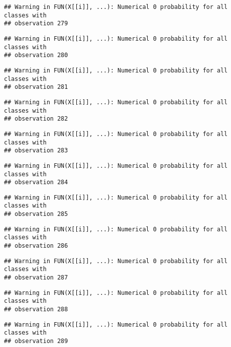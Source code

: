 \documentclass[
]{article}
\begin{document}
\begin{verbatim}
## Warning in FUN(X[[i]], ...): Numerical 0 probability for all classes with
## observation 279
\end{verbatim}

\begin{verbatim}
## Warning in FUN(X[[i]], ...): Numerical 0 probability for all classes with
## observation 280
\end{verbatim}

\begin{verbatim}
## Warning in FUN(X[[i]], ...): Numerical 0 probability for all classes with
## observation 281
\end{verbatim}

\begin{verbatim}
## Warning in FUN(X[[i]], ...): Numerical 0 probability for all classes with
## observation 282
\end{verbatim}

\begin{verbatim}
## Warning in FUN(X[[i]], ...): Numerical 0 probability for all classes with
## observation 283
\end{verbatim}

\begin{verbatim}
## Warning in FUN(X[[i]], ...): Numerical 0 probability for all classes with
## observation 284
\end{verbatim}

\begin{verbatim}
## Warning in FUN(X[[i]], ...): Numerical 0 probability for all classes with
## observation 285
\end{verbatim}

\begin{verbatim}
## Warning in FUN(X[[i]], ...): Numerical 0 probability for all classes with
## observation 286
\end{verbatim}

\begin{verbatim}
## Warning in FUN(X[[i]], ...): Numerical 0 probability for all classes with
## observation 287
\end{verbatim}

\begin{verbatim}
## Warning in FUN(X[[i]], ...): Numerical 0 probability for all classes with
## observation 288
\end{verbatim}

\begin{verbatim}
## Warning in FUN(X[[i]], ...): Numerical 0 probability for all classes with
## observation 289
\end{verbatim}
\end{document}

